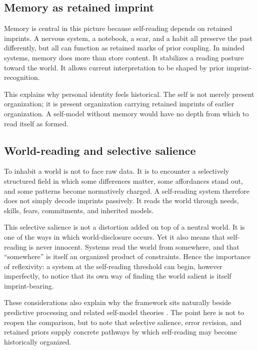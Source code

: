 \documentclass[12pt]{article}
\begin{document}
\subsection{Memory as retained imprint}

Memory is central in this picture because self-reading depends on retained imprints. A nervous system, a notebook, a scar, and a habit all preserve the past differently, but all can function as retained marks of prior coupling. In minded systems, memory does more than store content. It stabilizes a reading posture toward the world. It allows current interpretation to be shaped by prior imprint-recognition.

This explains why personal identity feels historical. The self is not merely present organization; it is present organization carrying retained imprints of earlier organization. A self-model without memory would have no depth from which to read itself as formed.

\subsection{World-reading and selective salience}

To inhabit a world is not to face raw data. It is to encounter a selectively structured field in which some differences matter, some affordances stand out, and some patterns become normatively charged. A self-reading system therefore does not simply decode imprints passively. It reads the world through needs, skills, fears, commitments, and inherited models.

This selective salience is not a distortion added on top of a neutral world. It is one of the ways in which world-disclosure occurs. Yet it also means that self-reading is never innocent. Systems read the world from somewhere, and that ``somewhere'' is itself an organized product of constraints. Hence the importance of reflexivity: a system at the self-reading threshold can begin, however imperfectly, to notice that its own way of finding the world salient is itself imprint-bearing.

These considerations also explain why the framework sits naturally beside predictive processing and related self-model theories \cite{Friston2010,Clark2013,Rosenthal2005,LauRosenthal2011}. The point here is not to reopen the comparison, but to note that selective salience, error revision, and retained priors supply concrete pathways by which self-reading may become historically organized.
\end{document}
